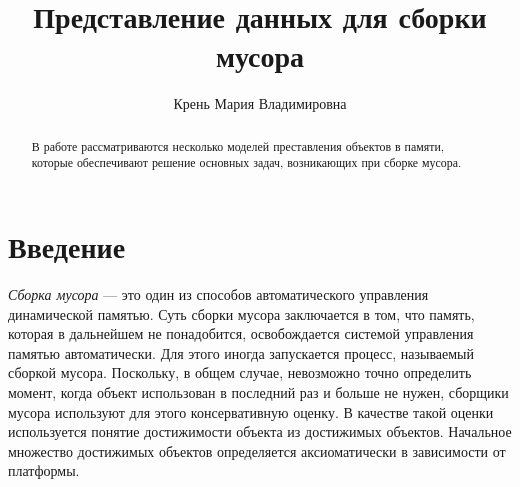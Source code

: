 




\title{Представление данных для сборки мусора}
%
\author{Крень Мария Владимировна}
%
%
%

\maketitle              %

\begin{abstract}
В работе рассматриваются несколько моделей преставления объектов
в памяти, которые обеспечивают решение основных задач, возникающих
при сборке мусора.
\end{abstract}
%


\section*{Введение}

\textit{Сборка мусора} — это один из способов автоматического управления динамической памятью.
Суть сборки мусора заключается в том, что память, которая в дальнейшем не понадобится, освобождается системой управления памятью автоматически. 
Для этого иногда запускается процесс, называемый сборкой  мусора.
Поскольку, в общем случае, невозможно точно определить момент, когда объект использован в последний раз и
больше не нужен, сборщики мусора используют для этого консервативную оценку.
В качестве такой оценки используется понятие достижимости объекта из достижимых объектов. 
Начальное множество достижимых объектов определяется аксиоматически в зависимости от платформы.

